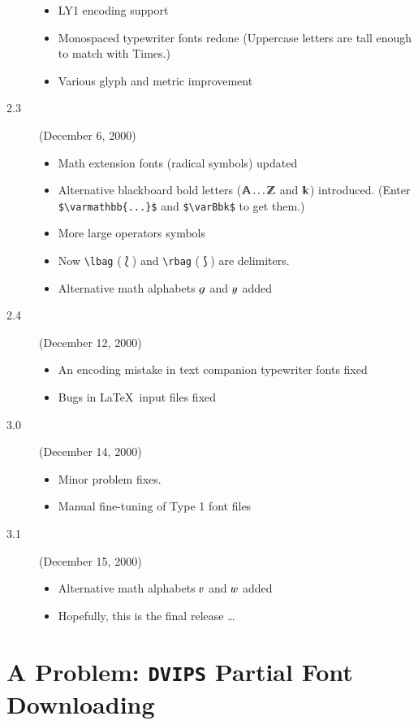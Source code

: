 \documentclass[11pt]{article}
\begin{document}
\begin{description}
     \begin{itemize}
     \item LY1 encoding support
     \item Monospaced typewriter fonts redone (Uppercase letters are tall enough to match with Times.)
     \item Various glyph and metric improvement
     \end{itemize}
\item[2.3] (December 6, 2000)
     \begin{itemize}
     \item Math extension fonts (radical symbols) updated
     \item Alternative blackboard bold letters ($\varmathbb{A}\ldots\varmathbb{Z}$ and $\varBbbk$)
           introduced. (Enter \verb|$\varmathbb{...}$| and \verb|$\varBbk$| to get them.)
     \item More large operators symbols
     \item Now \verb|\lbag| ($\lbag$) and \verb|\rbag| ($\rbag$) are
          delimiters.
     \item Alternative math alphabets $\varg$ and $\vary$ added
     \end{itemize}
\item[2.4] (December 12, 2000)
     \begin{itemize}
     \item An encoding mistake in text companion typewriter fonts fixed
     \item Bugs in \LaTeX\ input files fixed
     \end{itemize}
\item[3.0] (December 14, 2000)
     \begin{itemize}
     \item Minor problem fixes.
     \item Manual fine-tuning of Type 1 font files
     \end{itemize}
\item[3.1] (December 15, 2000)
     \begin{itemize}
     \item Alternative math alphabets $\varv$ and $\varw$ added
     \item Hopefully, this is the final release \ldots
     \end{itemize}
\end{description}

\section{A Problem: \texttt{DVIPS} Partial Font Downloading}
\end{document}
